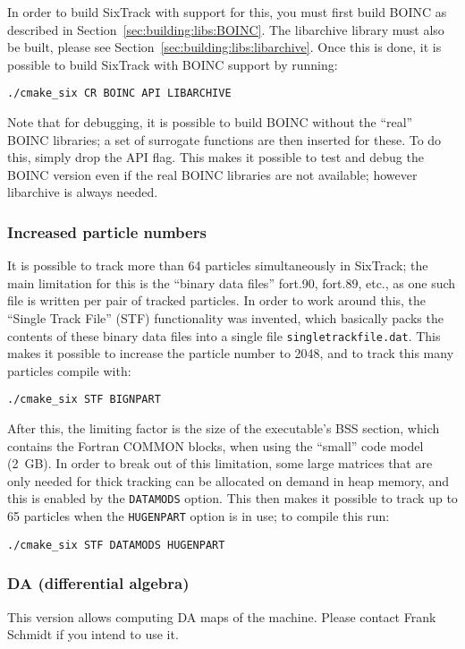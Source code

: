 \documentclass[english,BCOR=0mm,DIV=18]{scrartcl}
\begin{document}
In order to build SixTrack with support for this, you must first build BOINC as described in Section~\ref{sec:building:libs:BOINC}.
The libarchive library must also be built, please see Section~\ref{sec:building:libs:libarchive}.
Once this is done, it is possible to build SixTrack with BOINC support by running:
\begin{lstlisting}
./cmake_six CR BOINC API LIBARCHIVE
\end{lstlisting}

Note that for debugging, it is possible to build BOINC without the ``real'' BOINC libraries; a set of surrogate functions are then inserted for these.
To do this, simply drop the API flag.
This makes it possible to test and debug the BOINC version even if the real BOINC libraries are not available; however libarchive is always needed.


\subsubsection{Increased particle numbers}
It is possible to track more than 64 particles simultaneously in SixTrack; the main limitation for this is the ``binary data files'' fort.90, fort.89, etc., as one such file is written per pair of tracked particles.
In order to work around this, the ``Single Track File'' (STF) functionality was invented, which basically packs the contents of these binary data files into a single file \texttt{singletrackfile.dat}.
This makes it possible to increase the particle number to 2048, and to track this many particles compile with:
\begin{lstlisting}
./cmake_six STF BIGNPART
\end{lstlisting}

After this, the limiting factor is the size of the executable's BSS section, which contains the Fortran COMMON blocks, when using the ``small'' code model (2~GB).
In order to break out of this limitation, some large matrices that are only needed for thick tracking can be allocated on demand in heap memory, and this is enabled by the \texttt{DATAMODS} option.
This then makes it possible to track up to 65 particles when the \texttt{HUGENPART} option is in use; to compile this run:
\begin{lstlisting}
./cmake_six STF DATAMODS HUGENPART
\end{lstlisting}


\subsubsection{DA (differential algebra)}
This version allows computing DA maps of the machine.
Please contact Frank Schmidt if you intend to use it.
\end{document}
